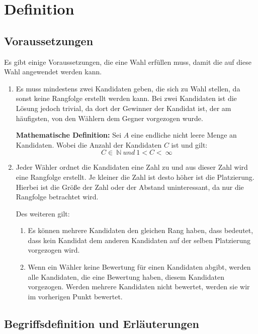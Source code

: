 \section{Definition}
\label{sec:definition}


\subsection{Voraussetzungen} 
\label{sec:voraussetzungen}
Es gibt einige Voraussetzungen, die eine Wahl erfüllen muss, damit die \schulze auf diese Wahl angewendet werden kann.

\begin{enumerate}
\item Es muss mindestens zwei Kandidaten geben, die sich zu Wahl stellen, da sonst keine Rangfolge erstellt werden kann. Bei zwei Kandidaten ist die Lösung jedoch trivial, da dort der Gewinner der Kandidat ist, der am häufigsten, von den Wählern dem Gegner vorgezogen wurde.

\textbf{Mathematische Definition:}
Sei $A$ eine endliche nicht leere Menge an Kandidaten. Wobei die Anzahl der Kandidaten $C$ ist und gilt: 
\[
  C \in\ \mathbb{N}\  und \ 1 < C <\ \infty
\]

\item Jeder Wähler ordnet die Kandidaten eine Zahl zu und aus dieser Zahl wird eine Rangfolge erstellt. Je kleiner die Zahl ist desto höher ist die Platzierung. Hierbei ist die Größe der Zahl oder der Abstand uninteressant, da nur die Rangfolge betrachtet wird.

Des weiteren gilt:
\begin{enumerate}
\item \label{itm:Regel1} Es können mehrere Kandidaten den gleichen Rang haben, dass bedeutet, dass kein Kandidat dem anderen Kandidaten auf der selben Platzierung vorgezogen wird. 
\item Wenn ein Wähler keine Bewertung für einen Kandidaten abgibt, werden alle Kandidaten, die eine Bewertung haben, diesem Kandidaten vorgezogen. Werden mehrere Kandidaten nicht bewertet, werden sie wir im vorherigen Punkt bewertet.
\end{enumerate}
\end{enumerate}

\subsection{Begriffsdefinition und Erläuterungen } 
\label{sec:begriffsdefinition}

